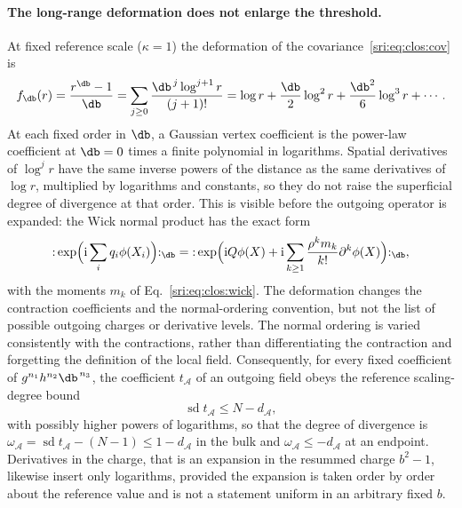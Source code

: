 \paragraph{The long-range deformation does not enlarge the threshold.} At fixed reference scale ($\kappa=1$) the
deformation of the covariance~\eqref{sri:eq:clos:cov} is
\begin{equation}
 f_{\db}(r)=\frac{r^{\db}-1}{\db}=\sum_{j\ge0}\frac{\db^{\,j}\log^{j+1}r}{(j+1)!}
 =\log r+\frac{\db}{2}\log^2r+\frac{\db^2}{6}\log^3r+\cdots.
 \label{sri:eq:clos:deform}
\end{equation}
At each fixed order in $\db$, a Gaussian vertex coefficient is the power-law coefficient at $\db=0$ times a finite
polynomial in logarithms. Spatial derivatives of $\log^jr$ have the same inverse powers of the distance as the same
derivatives of $\log r$, multiplied by logarithms and constants, so they do not raise the superficial degree of
divergence at that order. This is visible before the outgoing operator is expanded: the Wick normal product has the
exact form
\begin{equation}
 {:}\exp\Bigl(\mathrm i\sum_iq_i\phi(X_i)\Bigr){:}_{\db}
 ={:}\exp\Bigl(\mathrm iQ\phi(X)+\mathrm i\sum_{k\ge1}\frac{\rho^km_k}{k!}\partial^k\phi(X)\Bigr){:}_{\db},
\end{equation}
with the moments $m_k$ of Eq.~\eqref{sri:eq:clos:wick}. The deformation changes the contraction coefficients and the
normal-ordering convention, but not the list of possible outgoing charges or derivative levels. The normal ordering is
varied consistently with the contractions, rather than differentiating the contraction and forgetting the definition of
the local field. Consequently, for every fixed coefficient of $g^{n_1}h^{n_2}\db^{\,n_3}$, the coefficient
$t_{\mathcal A}$ of an outgoing field obeys the reference scaling-degree bound
\begin{equation}
 \operatorname{sd}t_{\mathcal A}\le N-d_{\mathcal A},
 \label{sri:eq:clos:sd}
\end{equation}
with possibly higher powers of logarithms, so that the degree of divergence is
$\omega_{\mathcal A}=\operatorname{sd}t_{\mathcal A}-(N-1)\le1-d_{\mathcal A}$ in the bulk and
$\omega_{\mathcal A}\le-d_{\mathcal A}$ at an endpoint. Derivatives in the charge, that is an expansion in the resummed
charge $b^2-1$, likewise insert only logarithms, provided the expansion is taken order by order about the reference
value and is not a statement uniform in an arbitrary fixed $b$.

